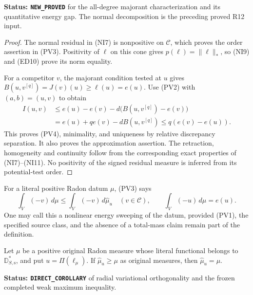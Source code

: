 \noindent\textbf{Status: \texttt{NEW\_PROVED}} for the
all-degree majorant characterization and its quantitative
energy gap. The normal decomposition is the preceding
proved R12 input.

\begin{proof}
The normal residual in (NI7) is nonpositive on $\mathscr C$,
which proves the order assertion in (PV3). Positivity of
$\ell$ on this cone gives $p(\ell)=\|\ell\|_*$, so (NI9)
and (ED10) prove its norm equality.

For a competitor $v$, the majorant condition tested at $u$
gives $B(u,v^{[q]})=J(v)(u)\geq\ell(u)=e(u)$.
Use (PV2) with $(a,b)=(u,v)$ to obtain
\[
 \begin{split}
 I(u,v)&\leq e(u)-e(v)-d\bigl(B(u,v^{[q]})-e(v)\bigr)\\
       &=e(u)+q e(v)-d B(u,v^{[q]})
                         \leq q(e(v)-e(u)).
 \end{split}
\]
This proves (PV4), minimality, and uniqueness by relative
discrepancy separation. It also proves the approximation
assertion. The retraction, homogeneity and continuity follow
from the corresponding exact properties of (NI7)--(NI11).
No positivity of the signed residual measure is inferred
from its potential-test order.
\end{proof}

For a literal positive Radon datum $\mu$, (PV3) says
\[
      \int_V(-v)\,d\mu\leq\int_V(-v)\,d\widehat\mu_u
               \quad(v\in\mathscr C),\qquad
      \int_V(-u)\,d\mu=e(u).
 \tag{PV5}
\]
One may call this a nonlinear energy sweeping of the datum,
provided (PV1), the specified source class, and the absence
of a total-mass claim remain part of the definition.

\begin{lemma}
\label{lem:r12-variational-positive-excess}
Let $\mu$ be a positive original Radon measure whose literal
functional belongs to $\mathbb D_{S,\mathrm s}^*$, and
put $u=\Pi(\ell_\mu)$. If $\widehat\mu_u\geq\mu$
as original measures, then $\widehat\mu_u=\mu$.
\end{lemma}

\noindent\textbf{Status: \texttt{DIRECT\_COROLLARY}} of
radial variational orthogonality and the frozen completed
weak maximum inequality.

